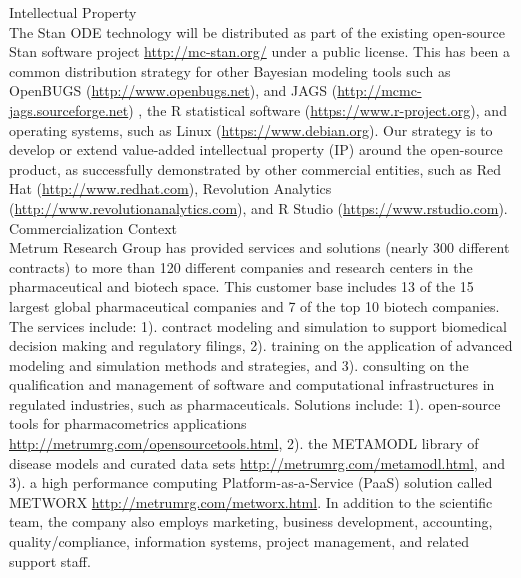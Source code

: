 \documentclass[11pt]{nih2016}
\begin{document}
\noindent
{\sc Intellectual Property}
\\[2pt]
The Stan ODE technology will be distributed as part of the existing
open-source Stan software project \url{http://mc-stan.org/} under a
public license. This has been a common distribution strategy for other
Bayesian modeling tools such as OpenBUGS
(\url{http://www.openbugs.net}), and JAGS
(\url{http://mcmc-jags.sourceforge.net}) , the R statistical software
(\url{https://www.r-project.org}), and operating systems, such as
Linux (\url{https://www.debian.org}). Our strategy is to develop or
extend value-added intellectual property (IP) around the open-source
product, as successfully demonstrated by other commercial entities,
such as Red Hat (\url{http://www.redhat.com}), Revolution Analytics
(\url{http://www.revolutionanalytics.com}), and R Studio
(\url{https://www.rstudio.com}).\\ 

\noindent
{\sc Commercialization Context}
\\[2pt]
Metrum Research Group has provided services and solutions (nearly 300
different contracts) to more than 120 different companies and research
centers in the pharmaceutical and biotech space. This customer base
includes 13 of the 15 largest global pharmaceutical companies and 7 of
the top 10 biotech companies. The services include: 1). contract
modeling and simulation to support biomedical decision making and
regulatory filings, 2). training on the application of advanced
modeling and simulation methods and strategies, and 3). consulting on
the qualification and management of software and computational
infrastructures in regulated industries, such as
pharmaceuticals. Solutions include: 1). open-source tools for
pharmacometrics applications
\url{http://metrumrg.com/opensourcetools.html}, 2). the METAMODL
library of disease models and curated data sets
\url{http://metrumrg.com/metamodl.html}, and 3). a high performance
computing Platform-as-a-Service (PaaS) solution called METWORX
\url{http://metrumrg.com/metworx.html}. In addition to the scientific
team, the company also employs marketing, business development,
accounting, quality/compliance, information systems, project
management, and related support staff.\\ 
\end{document}
